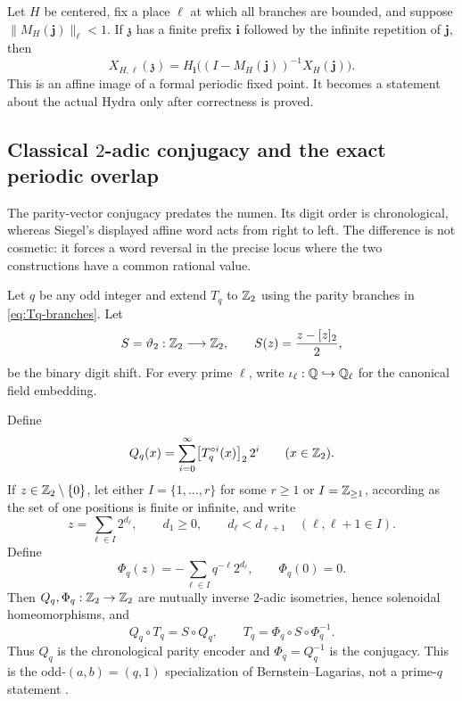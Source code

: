 Let $H$ be centered, fix a place $\ell$ at which all branches are bounded,
and suppose $\|M_H(\mathbf j)\|_\ell<1$.  If $\mathfrak z$ has a finite
prefix $\mathbf i$ followed by the infinite repetition of $\mathbf j$, then
\begin{equation}
\label{eq:eventually-periodic-numen}
 X_{H,\ell}(\mathfrak z)
 =H_{\mathbf i}\bigl((I-M_H(\mathbf j))^{-1}X_H(\mathbf j)\bigr).
\end{equation}
This is an affine image of a formal periodic fixed point.  It becomes a
statement about the actual Hydra only after correctness is proved.

\subsection{Classical \texorpdfstring{$2$}{2}-adic conjugacy and the exact
periodic overlap}

The parity-vector conjugacy predates the numen.  Its digit order is
chronological, whereas Siegel's displayed affine word acts from right to
left.  The difference is not cosmetic: it forces a word reversal in the
precise locus where the two constructions have a common rational value.

Let $q$ be any odd integer and extend $T_q$ to $\mathbb Z_2$ using the parity
branches in \cref{eq:Tq-branches}.  Let
\[
 S=\vartheta_2:\mathbb Z_2\longrightarrow\mathbb Z_2,
 \qquad S(z)=\frac{z-[z]_2}{2},
\]
be the binary digit shift.
For every prime $\ell$, write
$\iota_\ell:\mathbb Q\hookrightarrow\mathbb Q_\ell$ for the canonical field embedding.

\begin{proposition}
\label{prop:BL-conjugacy-typed}
Define
\begin{equation}
\label{eq:BL-parity-encoder}
 Q_q(x)=\sum_{i=0}^{\infty}\bigl[T_q^{\circ i}(x)\bigr]_2\,2^i
 \qquad(x\in\mathbb Z_2).
\end{equation}
If $z\in\mathbb Z_2\setminus\{0\}$, let either $I=\{1,\ldots,r\}$ for some $r\geq1$ or
$I=\mathbb Z_{\geq1}$, according as the set of one positions is finite or infinite,
and write
\[
 z=\sum_{\ell\in I}2^{d_\ell},
 \qquad d_1\geq0,
 \qquad d_\ell<d_{\ell+1}\quad(\ell,\ell+1\in I).
\]
Define
\begin{equation}
\label{eq:BL-inverse-formula}
 \Phi_q(z)=-\sum_{\ell\in I}q^{-\ell}2^{d_\ell},
 \qquad \Phi_q(0)=0.
\end{equation}
Then $Q_q,\Phi_q:\mathbb Z_2\to\mathbb Z_2$ are mutually inverse $2$-adic
isometries, hence solenoidal homeomorphisms, and
\begin{equation}
\label{eq:BL-conjugacy-oriented}
 Q_q\circ T_q=S\circ Q_q,
 \qquad
 T_q=\Phi_q\circ S\circ\Phi_q^{-1}.
\end{equation}
Thus $Q_q$ is the chronological parity encoder and
$\Phi_q=Q_q^{-1}$ is the conjugacy.  This is the odd-$(a,b)=(q,1)$
specialization of Bernstein--Lagarias, not a prime-$q$ statement
\cite[Eqs.~(1.3), (1.5), (1.6), (4.1), and~(4.2)]{BernsteinLagarias}.
\end{proposition}

